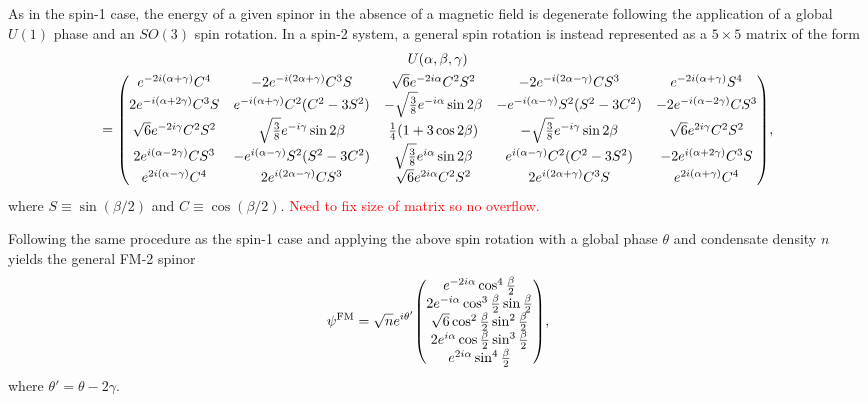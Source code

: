As in the spin-1 case, the energy of a given spinor in the absence of a magnetic
field is degenerate following the application of a global \(U(1)\) phase and an
\(SO(3)\) spin rotation.
In a spin-2 system, a general spin rotation is instead represented as a
\(5\times 5\) matrix of the form
\begin{multline}\label{eq: spin-2-rotation-matrix}
    U(\alpha, \beta, \gamma) \\
     = \mqty(
        e^{-2i(\alpha + \gamma)}C^4 & -2e^{-i(2\alpha+\gamma)}C^3S 
        & \sqrt{6}e^{-2i\alpha}C^2S^2 & -2e^{-i(2\alpha-\gamma)}CS^3
        & e^{-2i(\alpha + \gamma)}S^4
        \\
        2e^{-i(\alpha+2\gamma)}C^3S & e^{-i(\alpha+\gamma)}C^2(C^2-3S^2)
        & -\sqrt{\frac{3}{8}}e^{-i\alpha}\sin 2\beta
        & -e^{-i(\alpha-\gamma)}S^2(S^2-3C^2) & -2e^{-i(\alpha-2\gamma)}CS^3
        \\
        \sqrt{6}e^{-2i\gamma}C^2S^2 & \sqrt{\frac{3}{8}}e^{-i\gamma}\sin 2\beta
        & \frac{1}{4}(1+3\cos 2\beta)
        & -\sqrt{\frac{3}{8}}e^{-i\gamma}\sin 2\beta
        & \sqrt{6}e^{2i\gamma}C^2S^2
        \\
        2e^{i(\alpha-2\gamma)}CS^3 & -e^{i(\alpha-\gamma)}S^2(S^2-3C^2)
        & \sqrt{\frac{3}{8}}e^{i\alpha}\sin 2\beta
        & e^{i(\alpha-\gamma)}C^2(C^2-3S^2) & -2e^{i(\alpha+2\gamma)}C^3S
        \\
        e^{2i(\alpha - \gamma)}C^4 & 2e^{i(2\alpha-\gamma)}CS^3 
        & \sqrt{6}e^{2i\alpha}C^2S^2 & 2e^{i(2\alpha+\gamma)}C^3S
        & e^{2i(\alpha + \gamma)}C^4
    ),
\end{multline}
where \(S \equiv \sin(\beta/2)\) and \(C \equiv \cos(\beta/2)\).
\textcolor{red}{Need to fix size of matrix so no overflow.}

Following the same procedure as the spin-1 case and applying the above spin
rotation with a global phase \(\theta \) and condensate density \(n\) yields the
general FM-2 spinor
\begin{equation}\label{eq: FM-2-representative-spinor}
    \psi^\mathrm{FM} = \sqrt{n}e^{i\theta'}\mqty(
        e^{-2i\alpha} \cos^4\frac{\beta}{2} \\
        2e^{-i\alpha}\cos^3\frac{\beta}{2}\sin \frac{\beta}{2} \\
        \sqrt{6} \cos^2\frac{\beta}{2} \sin^2\frac{\beta}{2} \\
        2e^{i\alpha}\cos\frac{\beta}{2} \sin^3\frac{\beta}{2} \\
        e^{2i\alpha} \sin^4\frac{\beta}{2}
    ),
\end{equation}
where \(\theta'=\theta-2\gamma \).

